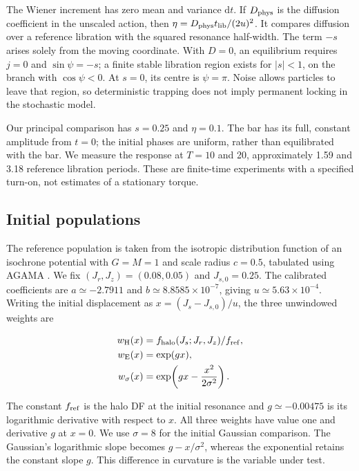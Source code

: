 \documentclass[fleqn,usenatbib]{mnras}
\begin{document}
The Wiener increment has zero mean and variance \(\mathrm dt\). If \(D_{\rm phys}\) is the diffusion coefficient in the unscaled action, then \(\eta=D_{\rm phys}t_{\rm lib}/(2u)^2\). It compares diffusion over a reference libration with the squared resonance half-width. The term \(-s\) arises solely from the moving coordinate. With \(D=0\), an equilibrium requires \(j=0\) and \(\sin\psi=-s\); a finite stable libration region exists for \(|s|<1\), on the branch with \(\cos\psi<0\). At \(s=0\), its centre is \(\psi=\pi\). Noise allows particles to leave that region, so deterministic trapping does not imply permanent locking in the stochastic model.

Our principal comparison has \(s=0.25\) and \(\eta=0.1\). The bar has its full, constant amplitude from \(t=0\); the initial phases are uniform, rather than equilibrated with the bar. We measure the response at \(T=10\) and 20, approximately 1.59 and 3.18 reference libration periods. These are finite-time experiments with a specified turn-on, not estimates of a stationary torque.

\subsection{Initial populations}\label{initial-populations}

The reference population is taken from the isotropic distribution function of an isochrone potential with \(G=M=1\) and scale radius \(c=0.5\), tabulated using AGAMA \citep{Vasiliev2019}. We fix \((J_r,J_z)=(0.08,0.05)\) and \(J_{s,0}=0.25\). The calibrated coefficients are \(a\simeq-2.7911\) and \(b\simeq8.8585\times10^{-7}\), giving \(u\simeq5.63\times10^{-4}\). Writing the initial displacement as \(x=(J_s-J_{s,0})/u\), the three unwindowed weights are

\begin{equation}\label{EQ-POP-01}
\begin{aligned}
w_{\rm H}(x)&=f_{\rm halo}(J_s;J_r,J_z)/f_{\rm ref},\\
w_{\rm E}(x)&=\exp(gx),\\
w_\sigma(x)&=\exp\!\left(gx-\frac{x^2}{2\sigma^2}\right).
\end{aligned}
\end{equation}

The constant \(f_{\rm ref}\) is the halo DF at the initial resonance and \(g\simeq-0.00475\) is its logarithmic derivative with respect to \(x\). All three weights have value one and derivative \(g\) at \(x=0\). We use \(\sigma=8\) for the initial Gaussian comparison. The Gaussian's logarithmic slope becomes \(g-x/\sigma^2\), whereas the exponential retains the constant slope \(g\). This difference in curvature is the variable under test.
\end{document}
